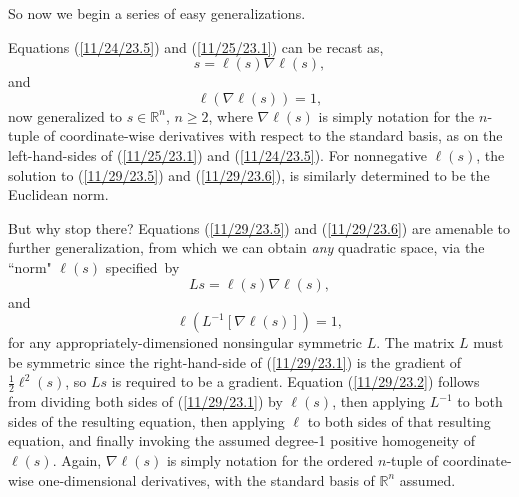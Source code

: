\documentclass{amsart}
\numberwithin{equation}{section}
\theoremstyle{definition}
\numberwithin{theorem}{section}
\begin{document}
  
So now we begin a series of easy generalizations.  

Equations (\ref{11/24/23.5}) and (\ref{11/25/23.1}) can be recast as, \begin{equation}\label{11/29/23.5} s = \ell(s)\nabla\ell(s),\end{equation} and\begin{equation}\label{11/29/23.6}\ell\left(\nabla\ell(s)\right) = 1,\end{equation} now generalized to $s\in \mathbb{R}^n$, $n\ge 2$, where $\nabla\ell(s)$ is simply notation for the $n$-tuple of coordinate-wise derivatives with respect to the standard basis, as on the left-hand-sides of  (\ref{11/25/23.1}) and (\ref{11/24/23.5}).  For nonnegative $\ell(s)$, the solution to (\ref{11/29/23.5}) and (\ref{11/29/23.6}), is similarly determined to be the Euclidean norm.  

But why stop there?  Equations (\ref{11/29/23.5}) and (\ref{11/29/23.6}) are amenable to further generalization, from which  we can obtain {\it any} quadratic space, via the ``norm" $\ell(s)$ \mbox{specified by} \begin{equation}\label{11/29/23.1} Ls = \ell(s)\nabla\ell(s),\end{equation} and \begin{equation}\label{11/29/23.2}\ell\left(L^{-1}[\nabla\ell(s)]\right) = 1,\end{equation} for any appropriately-dimensioned nonsingular symmetric $L$.  The matrix $L$ must be symmetric since the right-hand-side of (\ref{11/29/23.1}) is the gradient of $\frac{1}{2}\ell^2(s)$, so $Ls$ is required to be a gradient.  Equation (\ref{11/29/23.2}) follows from dividing both sides of (\ref{11/29/23.1}) by $\ell(s)$, then applying $L^{-1}$ to both sides of the resulting equation, then applying $\ell$ to both sides of that resulting equation, and finally invoking the assumed degree-1 positive homogeneity of $\ell(s)$. Again,  $\nabla\ell(s)$ is simply notation for the ordered $n$-tuple of  coordinate-wise one-dimensional derivatives, with the standard basis of $\mathbb{R}^n$ assumed.
  
\end{document}
